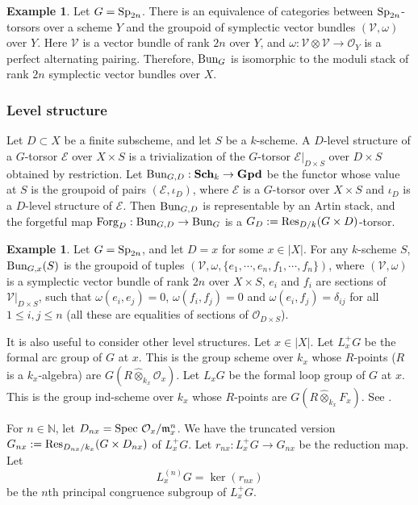 \documentclass[11pt]{amsart}
\numberwithin{equation}{section}
\theoremstyle{plain}
\theoremstyle{definition}
\newtheorem{exam}[subsubsection]{Example}
\def\NN{\mathbb{N}}
\newcommand\cE{\mathcal{E}}
\newcommand\cO{\mathcal{O}}
\newcommand\cV{\mathcal{V}}
\newcommand\fm{\mathfrak{m}}
\newcommand{\Bun}{\textup{Bun}}
\newcommand\Forg{\textup{Forg}}
\newcommand{\Res}{\textup{Res}}
\newcommand\Spec{\textup{Spec}\ }
\newcommand\Sp{\textup{Sp}}
\newcommand{\hotimes}{\widehat{\otimes}}
\newcommand\sss{\subsubsection}
\newcommand\ot{\otimes}
\renewcommand\d\delta
\newcommand{\io}{\iota}
\newcommand{\om}{\omega}
\newcommand\Sch{\mathbf{Sch}}
\newcommand\Gpd{\mathbf{Gpd}}
\begin{document}
\begin{exam} Let $G=\Sp_{2n}$. There is an equivalence of categories between $\Sp_{2n}$-torsors over a scheme $Y$ and the groupoid of  symplectic vector bundles $(\cV, \om)$ over $Y$. Here $\cV$ is a vector bundle of rank $2n$ over $Y$, and $\om: \cV\ot \cV\to \cO_{Y}$ is a perfect alternating pairing. Therefore, $\Bun_{G}$ is isomorphic to the moduli stack  of rank $2n$ symplectic vector bundles over $X$.
\end{exam}



\sss{Level structure}\label{sss:level}

Let $D\subset X$ be a finite subscheme, and let $S$ be a $k$-scheme. A $D$-level structure of a $G$-torsor $\cE$ over $X\times S$ is a trivialization of the $G$-torsor $\cE|_{D\times S}$ over $D\times S$ obtained by restriction.  Let $\Bun_{G,D}: \Sch_{k}\to \Gpd$ be the functor whose value at $S$ is the groupoid of pairs $(\cE,\io_{D})$, where $\cE$ is a $G$-torsor over $X\times S$ and $\io_{D}$ is a $D$-level structure of $\cE$. Then $\Bun_{G,D}$ is representable by an Artin stack, and the forgetful map $\Forg_{D}: \Bun_{G,D}\to \Bun_{G}$ is a $G_{D}:=\Res_{D/k}(G\times D)$-torsor.


\begin{exam} Let $G=\Sp_{2n}$, and let $D=x$ for some $x\in |X|$. For any $k$-scheme $S$,  $\Bun_{G,x}(S)$ is the groupoid of tuples $(\cV, \om, \{e_{1},\cdots, e_{n}, f_{1},\cdots, f_{n}\})$, where $(\cV,\om)$ is a symplectic vector bundle of rank $2n$ over $X\times S$, $e_{i}$ and $f_{i}$ are sections of $\cV|_{D\times S}$, such that $\om(e_{i},e_{j})=0$, $\om(f_{i},f_{j})=0$ and $\om(e_{i},f_{j})=\d_{ij}$ for all $1\le i,j\le n$ (all these are equalities of sections of $\cO_{D\times S}$).  
\end{exam}


It is also useful to consider other level structures. Let $x\in |X|$. Let $L^{+}_{x}G$ be the formal arc group of $G$ at $x$. This is the group scheme over $k_{x}$ whose $R$-points ($R$ is a $k_{x}$-algebra) are $G(R\hotimes_{k_{x}} \cO_{x})$. Let $L_{x}G$ be the formal loop group of $G$ at $x$. This is the group ind-scheme over $k_{x}$ whose $R$-points are $G(R\hotimes_{k_{x}} F_{x})$. See \cite[\S1.a]{PR}. %

For $n\in \NN$, let $D_{nx}=\Spec \cO_{x}/\fm^{n}_{x}$. We have the truncated version $G_{nx}:=\Res_{D_{nx}/k_{x}}(G\times D_{nx})$ of $L^{+}_{x}G$.  %
Let $r_{nx}: L^{+}_{x}G\to G_{nx}$ be the reduction map.  Let
\begin{equation*}
L^{(n)}_{x}G=\ker(r_{nx})
\end{equation*}
be the $n$th principal congruence subgroup of $L^{+}_{x}G$. 
\end{document}
